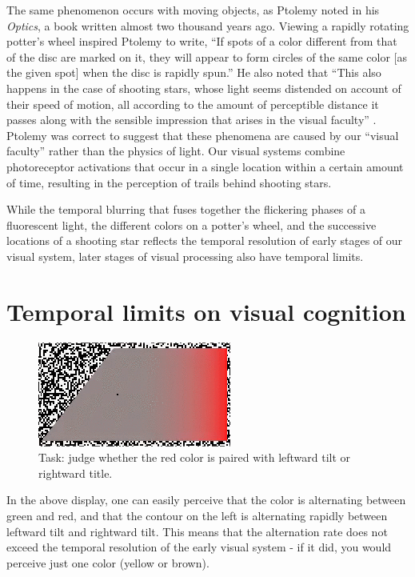 \documentclass[
]{book}
\begin{document}
The same phenomenon occurs with moving objects, as Ptolemy noted in his \emph{Optics}, a book written almost two thousand years ago. Viewing a rapidly rotating potter's wheel inspired Ptolemy to write, ``If spots of a color different from that of the disc are marked on it, they will appear to form circles of the same color {[}as the given spot{]} when the disc is rapidly spun.'' He also noted that ``This also happens in the case of shooting stars, whose light seems distended on account of their speed of motion, all according to the amount of perceptible distance it passes along with the sensible impression that arises in the visual faculty'' \citep{smithPtolemyTheoryVisual1996}. Ptolemy was correct to suggest that these phenomena are caused by our ``visual faculty'' rather than the physics of light. Our visual systems combine photoreceptor activations that occur in a single location within a certain amount of time, resulting in the perception of trails behind shooting stars.

While the temporal blurring that fuses together the flickering phases of a fluorescent light, the different colors on a potter's wheel, and the successive locations of a shooting star reflects the temporal resolution of early stages of our visual system, later stages of visual processing also have temporal limits.

\hypertarget{temporal-limits-on-visual-cognition}{%
\section{Temporal limits on visual cognition}\label{temporal-limits-on-visual-cognition}}

\begin{figure}
\includegraphics[width=0.3\linewidth]{movies/binding/colorgrdnt2_2fpsStatic} \caption{Task: judge whether the red color is paired with leftward tilt or rightward title.}\label{fig:redRightGreenLeft}
\end{figure}

In the above display, one can easily perceive that the color is alternating between green and red, and that the contour on the left is alternating rapidly between leftward tilt and rightward tilt. This means that the alternation rate does not exceed the temporal resolution of the early visual system - if it did, you would perceive just one color (yellow or brown).
\end{document}
